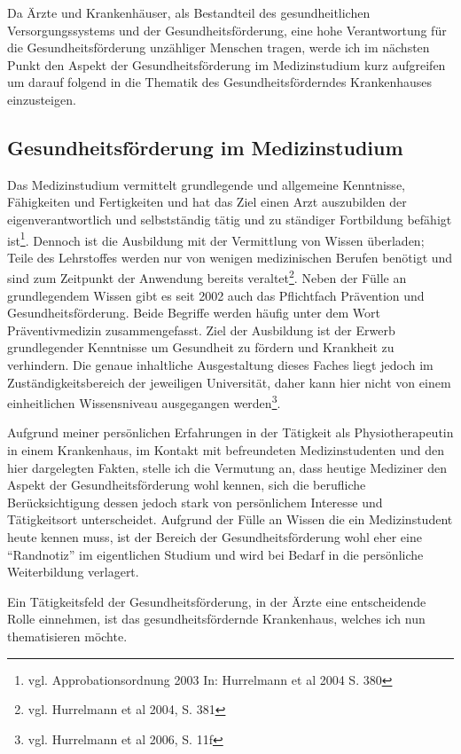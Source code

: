 Da Ärzte und Krankenhäuser, als Bestandteil des gesundheitlichen Versorgungssystems und der Gesundheitsförderung, eine hohe Verantwortung für die Gesundheitsförderung unzähliger Menschen tragen, werde ich im nächsten Punkt den Aspekt der Gesundheitsförderung im Medizinstudium kurz aufgreifen um darauf folgend in die Thematik des Gesundheitsförderndes Krankenhauses einzusteigen.

\subsection{Gesundheitsförderung im Medizinstudium}
\label{sec:GesundheitsförderungImMedizinstudium}

Das Medizinstudium vermittelt  grundlegende und allgemeine Kenntnisse, Fähigkeiten und Fertigkeiten und hat das Ziel einen Arzt auszubilden der eigenverantwortlich und selbstständig tätig und zu ständiger Fortbildung befähigt ist\footnote{vgl. Approbationsordnung 2003 In: Hurrelmann et al 2004 S. 380}. Dennoch ist die Ausbildung mit der Vermittlung von Wissen überladen; Teile des Lehrstoffes werden nur von wenigen medizinischen Berufen benötigt und sind zum Zeitpunkt der Anwendung bereits veraltet\footnote{vgl. Hurrelmann et al 2004, S. 381}. Neben der Fülle an grundlegendem Wissen gibt es seit 2002 auch das Pflichtfach Prävention und Gesundheitsförderung. Beide Begriffe werden häufig unter dem Wort Präventivmedizin zusammengefasst. Ziel der Ausbildung ist der Erwerb grundlegender Kenntnisse um Gesundheit zu fördern und Krankheit zu verhindern. Die genaue inhaltliche Ausgestaltung dieses Faches liegt jedoch im Zuständigkeitsbereich der jeweiligen Universität, daher kann hier nicht von einem einheitlichen Wissensniveau ausgegangen werden\footnote{vgl. Hurrelmann et al 2006, S. 11f}. 

Aufgrund meiner persönlichen Erfahrungen in der Tätigkeit als Physiotherapeutin in einem Krankenhaus, im Kontakt mit befreundeten Medizinstudenten und den hier dargelegten Fakten, stelle ich die Vermutung an, dass heutige Mediziner den Aspekt der Gesundheitsförderung wohl kennen, sich die berufliche Berücksichtigung dessen jedoch stark von persönlichem Interesse und Tätigkeitsort unterscheidet. Aufgrund der Fülle an Wissen die ein Medizinstudent heute kennen muss, ist der Bereich der Gesundheitsförderung wohl eher eine "`Randnotiz"' im eigentlichen Studium und wird bei Bedarf in die persönliche Weiterbildung verlagert. 

Ein Tätigkeitsfeld der Gesundheitsförderung, in der Ärzte eine entscheidende Rolle einnehmen, ist das gesundheitsfördernde Krankenhaus, welches ich nun thematisieren möchte.

